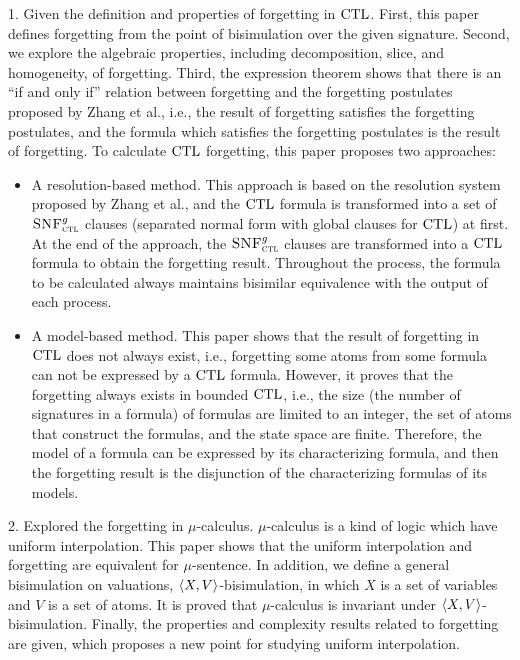 \begin{englishabstract}
1. Given the definition and properties of forgetting in $\textrm{CTL}$. First, this paper defines forgetting from the point of bisimulation over the given signature. Second, we explore the algebraic properties, including decomposition, slice, and homogeneity, of forgetting. Third, the expression theorem shows that there is an ``if and only if” relation between forgetting and the forgetting postulates proposed by Zhang et al., i.e., the result of forgetting satisfies the forgetting postulates, and the formula which satisfies the forgetting postulates is the result of forgetting.
To calculate $\textrm{CTL}$ forgetting, this paper proposes two approaches:

\begin{itemize}
	\item A resolution-based method. This approach is based on the resolution system proposed by Zhang et al., and the $\textrm{CTL}$ formula is transformed into a set of ${\textsc{SNF}_{\textsc{ctl}}^g}$ clauses (separated normal form with global clauses for $\textrm{CTL}$) at first. At the end of the approach, the ${\textsc{SNF}_{\textsc{ctl}}^g}$ clauses are transformed into a $\textrm{CTL}$ formula to obtain the forgetting result. Throughout the process, the formula to be calculated always maintains bisimilar equivalence with the output of each process.
	\item A model-based method. This paper shows that the result of forgetting in $\textrm{CTL}$ does not always exist, i.e., forgetting some atoms from some formula can not be expressed by a $\textrm{CTL}$ formula. However, it proves that the forgetting always exists in bounded $\textrm{CTL}$, i.e., the size (the number of signatures in a formula) of formulas are limited to an integer, the set of atoms that construct the formulas, and the state space are finite. Therefore, the model of a formula can be expressed by its characterizing formula, and then the forgetting result is the disjunction of the characterizing formulas of its models.
\end{itemize}

2. Explored the forgetting in $\mu$-calculus. $\mu$-calculus is a kind of logic which have uniform interpolation. This paper shows that the uniform interpolation and forgetting  are equivalent for $\mu$-sentence.
In addition, we define a general bisimulation on valuations, ${\langle{X,V}\rangle}$-bisimulation, in which $X$ is a set of variables and $V$ is a set of atoms.  It is proved that  $\mu$-calculus is invariant under ${\langle{X,V}\rangle}$-bisimulation.
Finally, the properties and complexity results related to forgetting are given, which proposes a new point for studying uniform interpolation.


\end{englishabstract}
